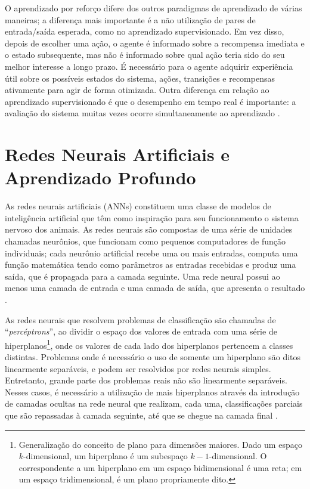 \documentclass[
	12pt,				%
	openright,			%
	oneside,			%
	a4paper,			%
	tccpreliminar,			%
	]{ABNT-DC-UEL}
\begin{document}
O aprendizado por reforço difere dos outros paradigmas de aprendizado de várias maneiras; a diferença mais importante é a não utilização de pares de entrada/saída esperada, como no aprendizado supervisionado. Em vez disso, depois de escolher uma ação, o agente é informado sobre a recompensa imediata e o estado subsequente, mas não é informado sobre qual ação teria sido do seu melhor interesse a longo prazo. É necessário para o agente adquirir experiência útil sobre os possíveis estados do sistema, ações, transições e recompensas ativamente para agir de forma otimizada. Outra diferença em relação ao aprendizado supervisionado é que o desempenho em tempo real é importante: a avaliação do sistema muitas vezes ocorre simultaneamente ao aprendizado \cite{kaelbiling:96}.

\section{Redes Neurais Artificiais e Aprendizado Profundo}

As redes neurais artificiais (ANNs) constituem uma classe de modelos de inteligência artificial que têm como inspiração para seu funcionamento o sistema nervoso dos animais. As redes neurais são compostas de uma série de unidades chamadas neurônios, que funcionam como pequenos computadores de função individuais; cada neurônio artificial recebe uma ou mais entradas, computa uma função matemática tendo como parâmetros as entradas recebidas e produz uma saída, que é propagada para a camada seguinte. Uma rede neural possui ao menos uma camada de entrada e uma camada de saída, que apresenta o resultado \cite{krogh:08, mathew:21}.

As redes neurais que resolvem problemas de classificação são chamadas de ``\textit{percéptrons}'', ao dividir o espaço dos valores de entrada com uma série de hiperplanos\footnote{Generalização do conceito de plano para dimensões maiores. Dado um espaço $k$-dimensional, um hiperplano é um subespaço $k-1$-dimensional. O correspondente a um hiperplano em um espaço bidimensional é uma reta; em um espaço tridimensional, é um plano propriamente dito.}, onde os valores de cada lado dos hiperplanos pertencem a classes distintas. Problemas onde é necessário o uso de somente um hiperplano são ditos linearmente separáveis, e podem ser resolvidos por redes neurais simples. Entretanto, grande parte dos problemas reais não são linearmente separáveis. Nesses casos, é necessário a utilização de mais hiperplanos através da introdução de camadas ocultas na rede neural que realizam, cada uma, classificações parciais que são repassadas à camada seguinte, até que se chegue na camada final \cite{krogh:08, alpaydin:20}.
\end{document}
